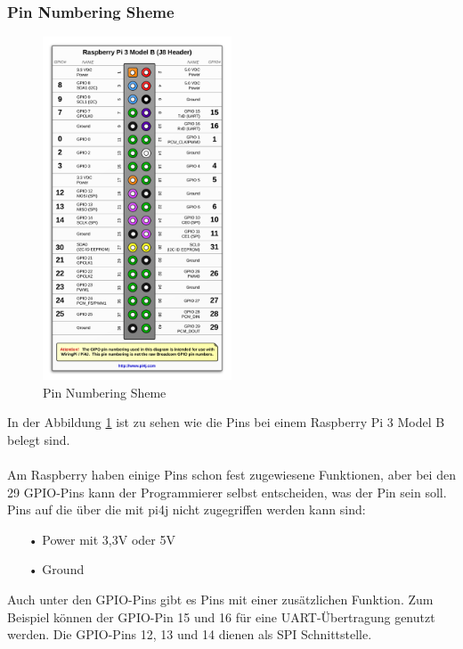 \newpage

\subsubsection{Pin Numbering Sheme}

\begin{figure}
\vspace{-35pt}
  \begin{center}
    \includegraphics[width=0.50\textwidth]{Bilder/pi4j/PinNumberingSheme}
  \end{center}
  \caption{Pin Numbering Sheme}
  \label{Pin Numbering Sheme}
  \vspace{-180pt}
\end{figure}

In der Abbildung \ref{Pin Numbering Sheme} ist zu sehen wie die Pins bei einem Raspberry Pi 3 Model B belegt sind.
\\ \\
Am Raspberry haben einige Pins schon fest zugewiesene Funktionen, aber bei den 29 GPIO-Pins kann der Programmierer selbst entscheiden, was der Pin sein soll.
\\Pins auf die über die mit pi4j nicht zugegriffen werden kann sind:
\begin{itemize}
\item[•] Power mit 3,3V oder 5V
\item[•] Ground
\end{itemize}
\vspace{10pt}
Auch unter den GPIO-Pins gibt es Pins mit einer zusätzlichen Funktion. Zum Beispiel können der GPIO-Pin 15 und 16 für eine UART-Übertragung genutzt werden. Die GPIO-Pins 12, 13 und 14 dienen als SPI Schnittstelle.

